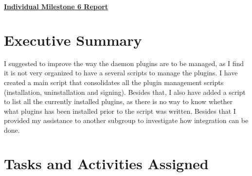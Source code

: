 \documentclass{article}
\begin{document}
\pagestyle{headings}

\begin{center}
{\LARGE\textbf{\underline{{Individual Milestone 6 Report}}}}
\end{center}

\section*{Executive Summary}

I suggested to improve the way the daemon plugins are to be managed, as I find it is not very organized to have a several scripts to manage the plugins. I have created a main script that consolidates all the plugin management scripts (installation, uninstallation and signing). Besides that, I also have added a script to list all the currently installed plugins, as there is no way to know whether what plugins has been installed prior to the script was written. Besides that I provided my assistance to another subgroup to investigate how integration can be done. 

\section*{Tasks and Activities Assigned}
\end{document}
